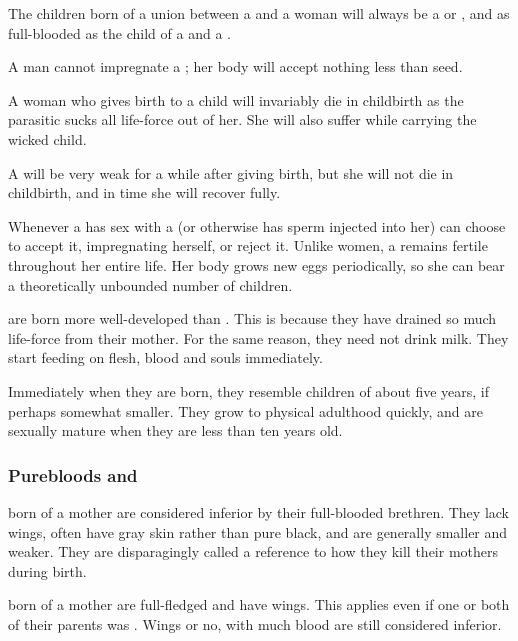 The children born of a union between a \resphan{} and a \human{} woman will always be a \resphan{} or \resvil, and as full-blooded as the child of a \resphan{} and a \resvil. 

A \human{} man cannot impregnate a \resvil; her body will accept nothing less than \resphan{} seed. 

A \human{} woman who gives birth to a \resphan{} child will invariably die in childbirth as the parasitic \resphan{} sucks all life-force out of her. She will also suffer while carrying the wicked child. 

A \resvil{} will be very weak for a while after giving birth, but she will not die in childbirth, and in time she will recover fully. 

Whenever a \resvil{} has sex with a \resphan{} (or otherwise has \resphan{} sperm injected into her) can choose to accept it, impregnating herself, or reject it. Unlike \human{} women, a \resvil{} remains fertile throughout her entire life. Her body grows new eggs periodically, so she can bear a theoretically unbounded number of children. 

\Resphain{} are born more well-developed than \humans{}. This is because they have drained so much life-force from their mother. For the same reason, they need not drink milk. They start feeding on flesh, blood and souls immediately. 

\label{Resphan sexual maturity}
Immediately when they are born, they resemble \human{} children of about five years, if perhaps somewhat smaller. They grow to physical adulthood quickly, and are sexually mature when they are less than ten years old. 





\subsubsection{Purebloods and \ashenbloods}
\label{Pureblood \Resphain}
\label{\ashenblood}
\label{\ashenbloods}
\Resphain{} born of a \human{} mother are considered inferior by their full-blooded brethren. They lack wings, often have gray skin rather than pure black, and are generally smaller and weaker. They are disparagingly called \quo{\ashenbloods}\dash a reference to how they kill their mothers during birth. 

\Resphain{} born of a \resvil{} mother are full-fledged \resphain{} and have wings. This applies even if one or both of their parents was \ashenblooded. Wings or no, \resphain{} with much \human{} blood are still considered inferior. 


